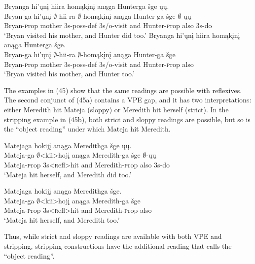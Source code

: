 \documentclass[output=paper]{LSP/langsci}
\begin{document}
\begin{exe}
\ex
\begin{xlist}
\ex
\glll Bryanga hi'ųnį hiira homąkįnį anąga Hunterga šge ųų.\\
Bryan-ga hi'ųnį $\emptyset$-hii-ra $\emptyset$-homąkįnį anąga Hunter-ga šge $\emptyset$-ųų\\
Bryan-{\textsc prop} mother {\textsc 3s-poss-def} {\textsc 3s/o}-visit and Hunter-{\textsc prop} also {\textsc 3s}-do\\
\trans `Bryan visited his mother, and Hunter did too.'
\ex
\glll Bryanga hi'ųnį hiira homąkįnį anąga Hunterga šge.\\
Bryan-ga hi'ųnį $\emptyset$-hii-ra $\emptyset$-homąkįnį anąga Hunter-ga šge\\
Bryan-{\textsc prop} mother {\textsc 3s-poss-def} {\textsc 3s/o}-visit and Hunter-{\textsc prop} also\\
\trans `Bryan visited his mother, and Hunter too.'
\end{xlist}
\end{exe}

The examples in (45) show that the same readings are possible with reflexives. The second conjunct of (45a) contains a VPE gap, and it has two interpretations: either Meredith hit Mateja (sloppy) or Meredith hit herself (strict). In the stripping example in (45b), both strict and sloppy readings are possible, but so is the ``object reading'' under which Mateja hit Meredith.

\begin{exe}
\ex
\begin{xlist}
\ex
\glll Matejaga hokijį anąga Meredithga šge ųų.\\
Mateja-ga $\emptyset$<kii>hojį anąga Meredith-ga šge $\emptyset$-ųų\\
Mateja-{\textsc prop} {\textsc 3s}<{\textsc refl}>hit and Meredith-{\textsc prop} also {\textsc 3s}-do\\
\trans `Mateja hit herself, and Meredith did too.'

\ex
\glll Matejaga hokijį anąga Meredithga šge.\\
Mateja-ga $\emptyset$<kii>hojį anąga Meredith-ga šge\\ 
Mateja-{\textsc prop} {\textsc 3s}<{\textsc refl}>hit and Meredith-{\textsc prop} also\\ 
\trans `Mateja hit herself, and Meredith too.'
\end{xlist}
\end{exe}

Thus, while strict and sloppy readings are available with both VPE and stripping, stripping constructions have the additional reading that \citealt{Fortin2007} calls the ``object reading''.
\end{document}
